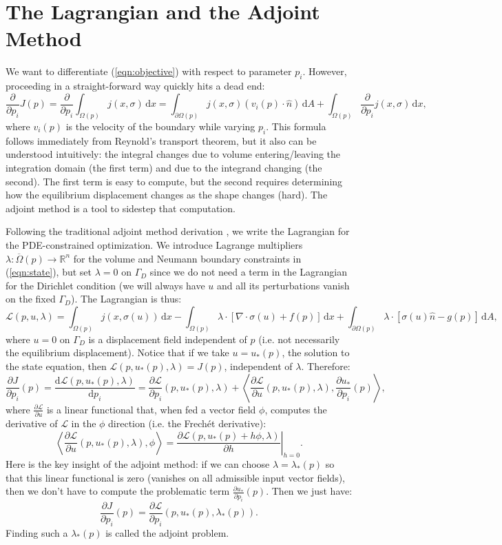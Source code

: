 \documentclass[10pt]{article}
\renewcommand{\div}{\nabla \cdot}
\providecommand{\shape}{\Omega(p)}
\providecommand{\boundary}{\partial \shape}
\providecommand{\vint}[1]{\int_{\shape} \! #1 \, \mathrm{d}x}
\providecommand{\sint}[1]{\int_{\boundary} \! #1 \, \mathrm{d}A}
\providecommand{\pder}[2]{\frac{\partial #1}{\partial #2}}
\providecommand{\tder}[2]{\frac{\mathrm{d} #1}{\mathrm{d} #2}}
\providecommand{\evalat}[2]{\left.#1\right|_{#2}}
\begin{document}
\section{The Lagrangian and the Adjoint Method}
We want to differentiate (\ref{eqn:objective}) with respect to parameter
$p_i$. However, proceeding in a straight-forward way quickly hits a dead end:
$$
\pder{}{p_i} J(p) = \pder{}{p_i} \vint{j(x, \sigma)} = \sint{j(x, \sigma) (v_i(p) \cdot \hat{n})} + \vint{\pder{}{p_i} j(x, \sigma)},
$$
where $v_i(p)$ is the velocity of the boundary while varying $p_i$. This
formula follows immediately from Reynold's transport theorem, but it also can be
understood intuitively: the integral changes due to volume entering/leaving the
integration domain (the first term) and due to the integrand changing (the
second). The first term is easy to compute, but the second requires determining
how the equilibrium displacement changes as the shape changes (hard). The
adjoint method is a tool to sidestep that computation.

Following the traditional adjoint method derivation \cite{ambrad:website}, we
write the Lagrangian for the PDE-constrained optimization. We introduce
Lagrange multipliers $\lambda\colon \overline{\Omega}(p) \to \mathbb{R}^n$ for
the volume and Neumann boundary constraints in (\ref{eqn:state}), but set $\lambda
= 0$ on $\Gamma_D$  since we do not need a term in the Lagrangian for the
Dirichlet condition (we will always
have $u$ and all its perturbations vanish on the fixed $\Gamma_D$). The
Lagrangian is thus:
$$
\mathcal{L}(p, u, \lambda) = \vint{j(x, \sigma(u))} - \vint{\lambda \cdot \left[\div \sigma(u) + f(p)\right]}
+ \sint{\lambda \cdot \left[\sigma(u) \hat{n} - g(p)\right]},
$$
where $u = 0$ on $\Gamma_D$ is a displacement field independent of $p$ (i.e. not
necessarily the equilibrium displacement). Notice that if we take $u = u_*(p)$,
the solution to the state equation, then $\mathcal{L}(p, u_*(p), \lambda) =
J(p)$, independent of $\lambda$. Therefore:
$$
\pder{J}{p_i}(p) = \tder{\mathcal{L}(p, u_*(p), \lambda)}{p_i}
= \pder{\mathcal{L}}{p_i}(p, u_*(p), \lambda) + \left<\pder{\mathcal{L}}{u}(p, u_*(p), \lambda), \pder{u_*}{p_i}(p)\right>,
$$
where $\pder{\mathcal{L}}{u}$ is a linear functional that, when fed a vector
field $\phi$, computes the derivative of $\mathcal{L}$ in the $\phi$ direction (i.e. the Frech\'et derivative):
$$
\left<\pder{\mathcal{L}}{u}(p, u_*(p), \lambda), \phi\right> =
\evalat{\pder{\mathcal{L}(p, u_*(p) + h \phi, \lambda)}{h}}{h = 0}.
$$
Here is the key insight of the adjoint method: if we can choose $\lambda = \lambda_*(p)$ so
that this linear functional is zero (vanishes on all admissible input vector fields), then
we don't have to compute the problematic term $\pder{u_*}{p_i}(p)$. Then we
just have:
\begin{equation}
\pder{J}{p_i}(p) = \pder{\mathcal{L}}{p_i}(p, u_*(p), \lambda_*(p)).
\label{eqn:gradient_format}
\end{equation}
Finding such a $\lambda_*(p)$ is called the adjoint problem.
\end{document}
